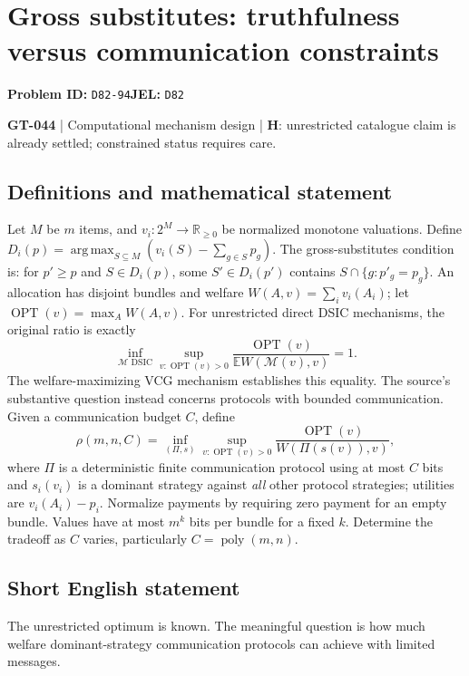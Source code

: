 \documentclass[11pt,a4paper]{article}
\begin{document}
\section*{Gross substitutes: truthfulness versus communication constraints}
\textbf{Problem ID:} \texttt{D82-94}\quad \textbf{JEL:} \texttt{D82}\par
\label{problem:OP-0174}
\label{game:GT-044}
{\sffamily\small\color{muted}
\textbf{GT-044} | Computational mechanism design | \textbf{H}: unrestricted catalogue claim is already settled; constrained status requires care.
\par}
\subsection*{Definitions and mathematical statement}
Let $M$ be $m$ items, and $v_i:2^M\to\mathbb R_{\geq0}$ be normalized monotone valuations. Define $D_i(p)=\operatorname*{arg\,max}_{S\subseteq M}(v_i(S)-\sum_{g\in S}p_g)$. The gross-substitutes condition is: for $p'\geq p$ and $S\in D_i(p)$, some $S'\in D_i(p')$ contains $S\cap\{g:p'_g=p_g\}$. An allocation has disjoint bundles and welfare $W(A,v)=\sum_i v_i(A_i)$; let $\operatorname{OPT}(v)=\max_A W(A,v)$.
For unrestricted direct DSIC mechanisms, the original ratio is exactly
\[
 \inf_{\mathcal M\text{ DSIC}}\sup_{v:\operatorname{OPT}(v)>0}
 \frac{\operatorname{OPT}(v)}{\mathbb E W(\mathcal M(v),v)}=1.
\]
The welfare-maximizing VCG mechanism establishes this equality. The source's substantive question instead concerns protocols with bounded communication. Given a communication budget $C$, define
\[
 \rho(m,n,C)=\inf_{(\Pi,s)}\sup_{v:\operatorname{OPT}(v)>0}
 \frac{\operatorname{OPT}(v)}{W(\Pi(s(v)),v)},
\]
where $\Pi$ is a deterministic finite communication protocol using at most $C$ bits and $s_i(v_i)$ is a dominant strategy against \emph{all} other protocol strategies; utilities are $v_i(A_i)-p_i$. Normalize payments by requiring zero payment for an empty bundle. Values have at most $m^k$ bits per bundle for a fixed $k$. Determine the tradeoff as $C$ varies, particularly $C=\operatorname{poly}(m,n)$.
\subsection*{Short English statement}
The unrestricted optimum is known. The meaningful question is how much welfare dominant-strategy communication protocols can achieve with limited messages.
\end{document}
